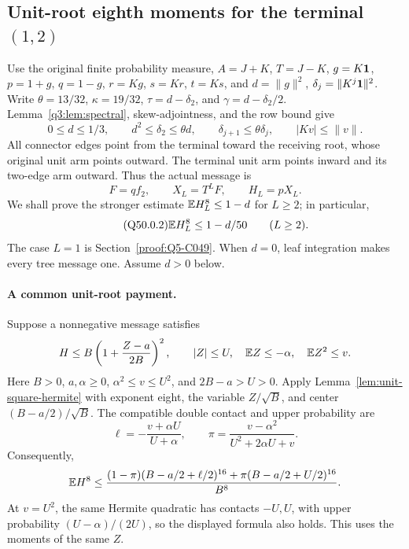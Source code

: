\subsection{Unit-root eighth moments for the terminal \((1,2)\)}
\label{proof:Q5-C050}
Use the original finite probability measure, \(A=J+K\), \(T=J-K\),
\(g=K\mathbf1\), \(p=1+g\), \(q=1-g\),
\(r=Kg\), \(s=Kr\), \(t=Ks\), and
\(d=\|g\|^2\), \(\delta_j=\|K^j\mathbf1\|^2\).
Write \(\theta=13/32\), \(\kappa=19/32\),
\(\tau=d-\delta_2\), and \(\gamma=d-\delta_2/2\).
Lemma~\ref{q3:lem:spectral}, skew-adjointness, and the row bound give
\[
 0\le d\le1/3,\qquad d^2\le\delta_2\le\theta d,
 \qquad\delta_{j+1}\le\theta\delta_j,\qquad |Kv|\le\|v\|.
\]
All connector edges point from the terminal toward the receiving root,
whose original unit arm points outward. The terminal unit arm points
inward and its two-edge arm outward. Thus the actual message is
\begin{equation}\tag{Q50.0.1}\label{eq:Q50:0.1}
 F=qf_2,\qquad X_L=T^LF,\qquad H_L=pX_L.
\end{equation}
We shall prove the stronger estimate \(\mathbb E H_L^8\le1-d\) for \(L\ge2\);
in particular,
\begin{equation}\tag{Q50.0.2}\label{eq:Q50:0.2}
 \mathbb E H_L^8\le1-d/50\qquad(L\ge2).
\end{equation}
The case \(L=1\) is Section~\ref{proof:Q5-C049}.
When \(d=0\), leaf integration makes every tree message one.
Assume \(d>0\) below.

\paragraph{A common unit-root payment.}
Suppose a nonnegative message satisfies
\begin{equation}\label{eq:unit-ordinary:positive-square}
 H\le B\left(1+\frac{Z-a}{2B}\right)^2,
 \qquad |Z|\le U,\quad \mathbb E Z\le-\alpha,\quad \mathbb E Z^2\le v.
\end{equation}
Here \(B>0\), \(a,\alpha\ge0\), \(\alpha^2\le v\le U^2\),
and \(2B-a>U>0\).
Apply Lemma~\ref{lem:unit-square-hermite} with exponent eight,
the variable \(Z/\sqrt B\), and center \((B-a/2)/\sqrt B\).
The compatible double contact and upper probability are
\[
 \ell=-\frac{v+\alpha U}{U+\alpha},\qquad
 \pi=\frac{v-\alpha^2}{U^2+2\alpha U+v}.
\]
Consequently,
\begin{equation}\label{eq:unit-ordinary:compatible-sixteen}
 \mathbb E H^8\le
 \frac{(1-\pi)(B-a/2+\ell/2)^{16}
             +\pi(B-a/2+U/2)^{16}}{B^8}.
\end{equation}
At \(v=U^2\), the same Hermite quadratic has contacts \(-U,U\),
with upper probability \((U-\alpha)/(2U)\), so the displayed formula
also holds.
This uses the moments of the same $Z$.

